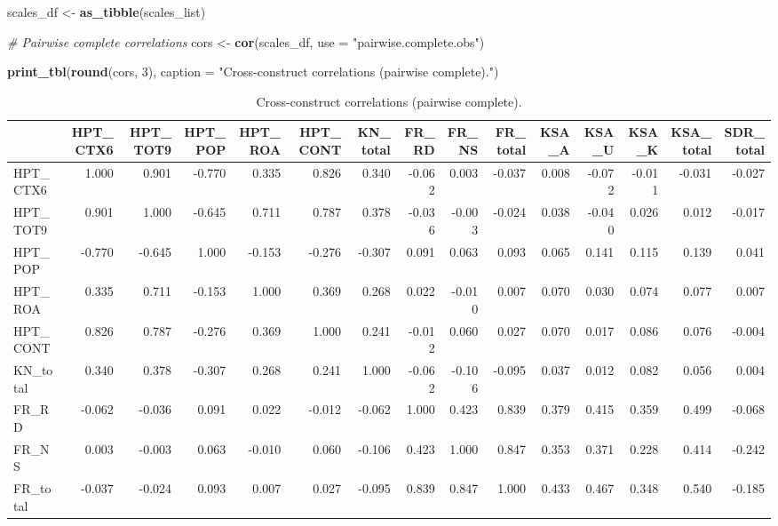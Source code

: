 \documentclass[
  10pt,
]{article}
\newenvironment{Shaded}{\begin{snugshade}}{\end{snugshade}}
\newcommand{\AttributeTok}[1]{\textcolor[rgb]{0.13,0.29,0.53}{#1}}
\newcommand{\CommentTok}[1]{\textcolor[rgb]{0.56,0.35,0.01}{\textit{#1}}}
\newcommand{\DecValTok}[1]{\textcolor[rgb]{0.00,0.00,0.81}{#1}}
\newcommand{\FunctionTok}[1]{\textcolor[rgb]{0.13,0.29,0.53}{\textbf{#1}}}
\newcommand{\NormalTok}[1]{#1}
\newcommand{\OtherTok}[1]{\textcolor[rgb]{0.56,0.35,0.01}{#1}}
\newcommand{\StringTok}[1]{\textcolor[rgb]{0.31,0.60,0.02}{#1}}
\begin{document}
\begin{Shaded}
\begin{Highlighting}[]
\NormalTok{scales\_df }\OtherTok{\textless{}{-}} \FunctionTok{as\_tibble}\NormalTok{(scales\_list)}

\CommentTok{\# Pairwise complete correlations}
\NormalTok{cors }\OtherTok{\textless{}{-}} \FunctionTok{cor}\NormalTok{(scales\_df, }\AttributeTok{use =} \StringTok{"pairwise.complete.obs"}\NormalTok{)}

\FunctionTok{print\_tbl}\NormalTok{(}\FunctionTok{round}\NormalTok{(cors, }\DecValTok{3}\NormalTok{), }\AttributeTok{caption =} \StringTok{"Cross{-}construct correlations (pairwise complete)."}\NormalTok{)}
\end{Highlighting}
\end{Shaded}

\begin{longtable}[t]{lrrrrrrrrrrrrrr}
\caption{\label{tab:cross-construct-correlations}Cross-construct correlations (pairwise complete).}\\
\toprule
  & HPT\_CTX6 & HPT\_TOT9 & HPT\_POP & HPT\_ROA & HPT\_CONT & KN\_total & FR\_RD & FR\_NS & FR\_total & KSA\_A & KSA\_U & KSA\_K & KSA\_total & SDR\_total\\
\midrule
HPT\_CTX6 & 1.000 & 0.901 & -0.770 & 0.335 & 0.826 & 0.340 & -0.062 & 0.003 & -0.037 & 0.008 & -0.072 & -0.011 & -0.031 & -0.027\\
HPT\_TOT9 & 0.901 & 1.000 & -0.645 & 0.711 & 0.787 & 0.378 & -0.036 & -0.003 & -0.024 & 0.038 & -0.040 & 0.026 & 0.012 & -0.017\\
HPT\_POP & -0.770 & -0.645 & 1.000 & -0.153 & -0.276 & -0.307 & 0.091 & 0.063 & 0.093 & 0.065 & 0.141 & 0.115 & 0.139 & 0.041\\
HPT\_ROA & 0.335 & 0.711 & -0.153 & 1.000 & 0.369 & 0.268 & 0.022 & -0.010 & 0.007 & 0.070 & 0.030 & 0.074 & 0.077 & 0.007\\
HPT\_CONT & 0.826 & 0.787 & -0.276 & 0.369 & 1.000 & 0.241 & -0.012 & 0.060 & 0.027 & 0.070 & 0.017 & 0.086 & 0.076 & -0.004\\
\addlinespace
KN\_total & 0.340 & 0.378 & -0.307 & 0.268 & 0.241 & 1.000 & -0.062 & -0.106 & -0.095 & 0.037 & 0.012 & 0.082 & 0.056 & 0.004\\
FR\_RD & -0.062 & -0.036 & 0.091 & 0.022 & -0.012 & -0.062 & 1.000 & 0.423 & 0.839 & 0.379 & 0.415 & 0.359 & 0.499 & -0.068\\
FR\_NS & 0.003 & -0.003 & 0.063 & -0.010 & 0.060 & -0.106 & 0.423 & 1.000 & 0.847 & 0.353 & 0.371 & 0.228 & 0.414 & -0.242\\
FR\_total & -0.037 & -0.024 & 0.093 & 0.007 & 0.027 & -0.095 & 0.839 & 0.847 & 1.000 & 0.433 & 0.467 & 0.348 & 0.540 & -0.185\\

\end{longtable}
\end{document}
